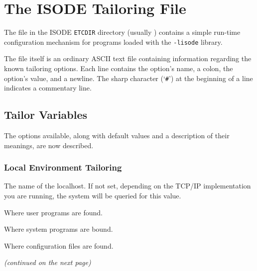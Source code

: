 
\chapter	{The ISODE Tailoring File}\label{isotailor}
The file  in the ISODE \verb"ETCDIR" directory
(usually )
contains a simple run-time configuration
mechanism for programs loaded with the \verb"-lisode" library.

The file itself is an ordinary ASCII text file containing information
regarding the known tailoring options.
Each line contains the option's name, a colon, the option's value, and a
newline.
The sharp character (`\verb"#"') at the beginning of a line indicates a
commentary line.

\section	{Tailor Variables}
The options available,
along with default values and a description of their meanings,
are now described.

\subsection	{Local Environment Tailoring}
\begin{describe}
\item[\verb"localname":] The name of the localhost.
If not set,
depending on the TCP/IP implementation you are running,
the system will be queried for this value.

\item[\verb"binpath":] Where user programs are found.

\item[\verb"sbinpath":] Where system programs are bound.

\item[\verb"etcpath":] Where configuration files are found.
\end{describe}

\vspace{0.1in}		%
\begin{center}\em
(continued on the next page)
\end{center}
\newpage

